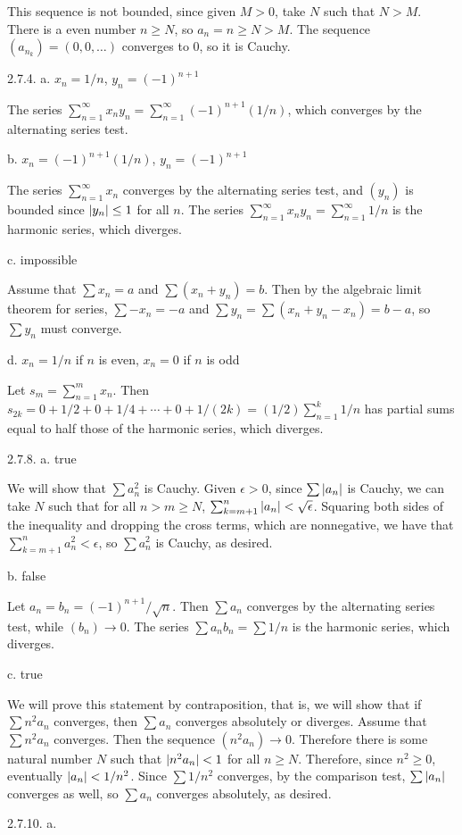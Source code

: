 This sequence is not bounded, since given $M > 0$,
take $N$ such that $N > M$.
There is a even number $n \ge N$, so $a_n = n \ge N > M$.
The sequence $(a_{n_k}) = (0,0,\ldots)$ converges to $0$, so it is Cauchy.
\bigskip
\item{2.7.4.} a. $x_n = 1/n$, $y_n = (-1)^{n+1}$

The series $\sum _{n=1} ^\infty x_n y_n = \sum _{n=1} ^\infty (-1)^{n+1} (1/n)$,
which converges by the alternating series test.
\medskip
\item{} b. $x_n = (-1)^{n+1} (1/n)$, $y_n = (-1)^{n+1}$

The series $\sum _{n=1} ^\infty x_n$ converges by the alternating series test,
and $(y_n)$ is bounded since $\vert{y_n}\vert \le 1$ for all $n$.
The series $\sum _{n=1} ^\infty x_n y_n = \sum _{n=1} ^\infty 1/n$
is the harmonic series, which diverges.
\medskip
\item{} c. impossible

Assume that $\sum x_n = a$ and $\sum (x_n + y_n) = b$.
Then by the algebraic limit theorem for series,
$\sum -x_n = -a$ and $\sum y_n = \sum (x_n + y_n - x_n) = b - a$,
so $\sum y_n$ must converge.
\medskip
\item{} d. $x_n = 1/n$ if $n$ is even, $x_n = 0$ if $n$ is odd

Let $s_m = \sum _{n=1} ^m x_n$.
Then $s_{2k} = 0 + 1/2 + 0 + 1/4 + \cdots + 0 + 1/(2k) =
(1/2) \sum _{n=1} ^k 1/n$ has partial sums
equal to half those of the harmonic series, which diverges.
\bigskip
\item{2.7.8.} a. true

We will show that $\sum a_n ^2$ is Cauchy.
Given $\epsilon > 0$, since $\sum \vert{a_n}\vert$ is Cauchy,
we can take $N$ such that for all $n > m \ge N$,
$\sum _{k=m+1} ^n \vert{a_n}\vert < \sqrt \epsilon$.
Squaring both sides of the inequality
and dropping the cross terms, which are nonnegative,
we have that $\sum _{k=m+1} ^n a_n ^2 < \epsilon$,
so $\sum a_n ^2$ is Cauchy, as desired.
\medskip
\item{} b. false

Let $a_n = b_n = (-1)^{n+1} / \sqrt n$.
Then $\sum a_n$ converges by the alternating series test,
while $(b_n) \to 0$.
The series $\sum a_n b_n = \sum 1/n$ is the harmonic series,
which diverges.
\medskip
\item{} c. true

We will prove this statement by contraposition,
that is, we will show that if $\sum n^2 a_n$ converges,
then $\sum a_n$ converges absolutely or diverges.
Assume that $\sum n^2 a_n$ converges.
Then the sequence $(n^2 a_n) \to 0$.
Therefore there is some natural number $N$ such that
$\vert{n^2 a_n}\vert < 1$ for all $n \ge N$.
Therefore, since $n^2 \ge 0$, eventually $\vert{a_n}\vert < 1/n^2$.
Since $\sum 1/n^2$ converges, by the comparison test,
$\sum \vert{a_n}\vert$ converges as well,
so $\sum a_n$ converges absolutely, as desired.
\bigskip
\item{2.7.10.} a.

